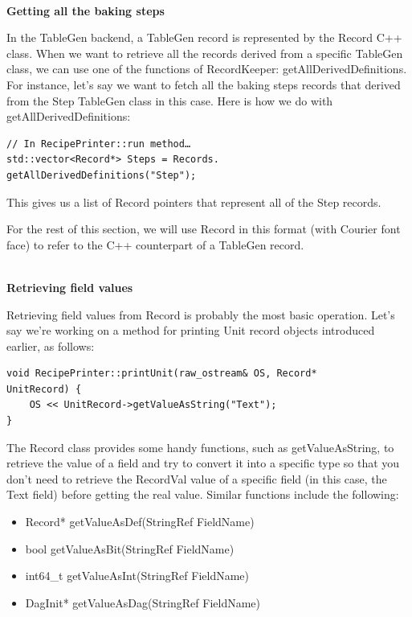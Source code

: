 \hspace*{\fill} \\ %
\noindent
\textbf{Getting all the baking steps}

In the TableGen backend, a TableGen record is represented by the Record C++ class. When we want to retrieve all the records derived from a specific TableGen class, we can use one of the functions of RecordKeeper: getAllDerivedDefinitions. For instance, let's say we want to fetch all the baking steps records that derived from the Step TableGen class in this case. Here is how we do with getAllDerivedDefinitions:

\begin{lstlisting}[style=styleCXX]
// In RecipePrinter::run method…
std::vector<Record*> Steps = Records.
getAllDerivedDefinitions("Step");
\end{lstlisting}

This gives us a list of Record pointers that represent all of the Step records.

\begin{tcolorbox}[colback=blue!5!white,colframe=blue!75!black, fonttitle=\bfseries,title=Note]
\hspace*{0.7cm}For the rest of this section, we will use Record in this format (with Courier font face) to refer to the C++ counterpart of a TableGen record.
\end{tcolorbox}

\hspace*{\fill} \\ %
\noindent
\textbf{Retrieving field values}

Retrieving field values from Record is probably the most basic operation. Let's say we're working on a method for printing Unit record objects introduced earlier, as follows:

\begin{lstlisting}[style=styleCXX]
void RecipePrinter::printUnit(raw_ostream& OS, Record*
UnitRecord) {
	OS << UnitRecord->getValueAsString("Text");
}
\end{lstlisting}

The Record class provides some handy functions, such as getValueAsString, to retrieve the value of a field and try to convert it into a specific type so that you don't need to retrieve the RecordVal value of a specific field (in this case, the Text field) before getting the real value. Similar functions include the following:

\begin{itemize}
\tt
\item Record* getValueAsDef(StringRef FieldName)
\item bool getValueAsBit(StringRef FieldName)
\item int64\_t getValueAsInt(StringRef FieldName)
\item DagInit* getValueAsDag(StringRef FieldName)
\end{itemize}

